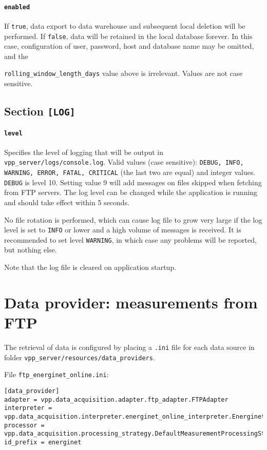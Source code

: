 \paragraph{\texttt{enabled}} If \texttt{true}, data export to data warehouse and subsequent local deletion will be performed. If \texttt{false}, data will be retained in the local database forever. In this case, configuration of user, password, host and database name may be omitted, and the {\texttt{rolling\_window\_length\_days} value above is irrelevant. Values are not case sensitive.
	
\subsection{Section \texttt{[LOG]}}
\paragraph{\texttt{level}} Specifies the level of logging that will be output in \\ \texttt{vpp\_server/logs/console.log}. Valid values (case sensitive): \texttt{DEBUG, INFO, WARNING, ERROR, FATAL, CRITICAL} (the last two are equal) and integer values. \texttt{DEBUG} is level 10. Setting value 9 will add messages on files skipped when fetching from FTP servers. The log level can be changed while the application is running and should take effect within 5 seconds.

No file rotation is performed, which can cause log file to grow very large if the log level is set to \texttt{INFO} or lower and a high volume of messages is received. It is recommended to set level \texttt{WARNING}, in which case any problems will be reported, but nothing else.

Note that the log file is cleared on application startup.

\section{Data provider: measurements from FTP}
\label{sec:data_provider_config}
The retrieval of data is configured by placing a \texttt{.ini} file for each data source in folder \texttt{vpp\_server/resources/data\_providers}. 


File \texttt{ftp\_energinet\_online.ini}:
\begin{lstlisting}
[data_provider]
adapter = vpp.data_acquisition.adapter.ftp_adapter.FTPAdapter
interpreter = vpp.data_acquisition.interpreter.energinet_online_interpreter.EnerginetOnlineInterpreter
processor = vpp.data_acquisition.processing_strategy.DefaultMeasurementProcessingStrategy
id_prefix = energinet


\end{lstlisting}}
